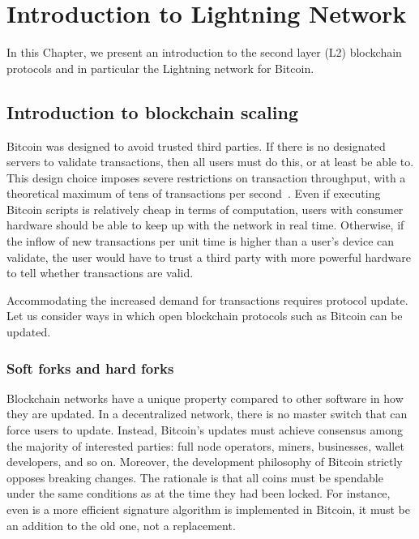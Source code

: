 \chapter{Introduction to Lightning Network}

\label{Chapter05IntroLightning}

In this Chapter, we present an introduction to the second layer (L2) blockchain protocols and in particular the Lightning network for Bitcoin.

\section{Introduction to blockchain scaling}

Bitcoin was designed to avoid trusted third parties.
If there is no designated servers to validate transactions, then all users must do this, or at least be able to.
This design choice imposes severe restrictions on transaction throughput, with a theoretical maximum of tens of transactions per second~\cite{Croman2016}.
Even if executing Bitcoin scripts is relatively cheap in terms of computation, users with consumer hardware should be able to keep up with the network in real time.
Otherwise, if the inflow of new transactions per unit time is higher than a user's device can validate, the user would have to trust a third party with more powerful hardware to tell whether transactions are valid.

Accommodating the increased demand for transactions requires protocol update.
Let us consider ways in which open blockchain protocols such as Bitcoin can be updated.

\subsection{Soft forks and hard forks}
Blockchain networks have a unique property compared to other software in how they are updated.
In a decentralized network, there is no master switch that can force users to update.
Instead, Bitcoin's updates must achieve consensus among the majority of interested parties: full node operators, miners, businesses, wallet developers, and so on.
Moreover, the development philosophy of Bitcoin strictly opposes breaking changes.
The rationale is that all coins must be spendable under the same conditions as at the time they had been locked.
For instance, even is a more efficient signature algorithm is implemented in Bitcoin, it must be an addition to the old one, not a replacement.

